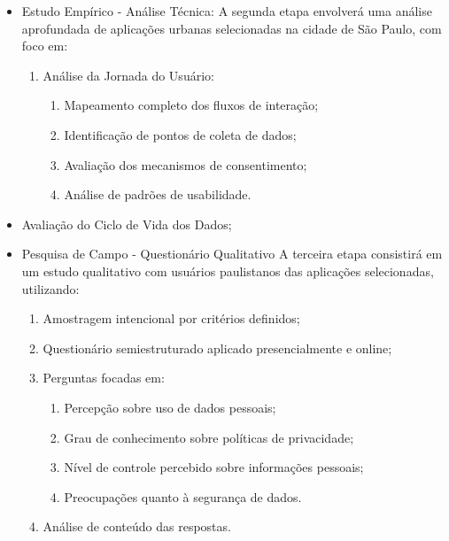 \documentclass[
	12pt,				%
	oneside,			%
	a4paper,			%
	english,			%
	brazil				%
	]{abntex2ppgsi}
\begin{document}
\begin{itemize}
             \item Estudo Empírico - Análise Técnica:
             A segunda etapa envolverá uma análise aprofundada de aplicações urbanas selecionadas na cidade de São Paulo, com foco em:
                 \begin{enumerate}
                   \item Análise da Jornada do Usuário:
                     \begin{enumerate}
                        \item Mapeamento completo dos fluxos de interação;
                        \item Identificação de pontos de coleta de dados;
                        \item Avaliação dos mecanismos de consentimento;
                        \item Análise de padrões de usabilidade.
                     \end{enumerate}
                 \end{enumerate}
                 \end{itemize}
                 \begin{itemize}
                   \item Avaliação do Ciclo de Vida dos Dados;   
             \item Pesquisa de Campo - Questionário Qualitativo 
             A terceira etapa consistirá em um estudo qualitativo com usuários paulistanos das aplicações selecionadas, utilizando:
                 \begin{enumerate}
                   \item Amostragem intencional por critérios definidos;
                   \item Questionário semiestruturado aplicado presencialmente e online;
                   \item Perguntas focadas em:
                     \begin{enumerate}
                        \item Percepção sobre uso de dados pessoais;
                        \item Grau de conhecimento sobre políticas de privacidade;
                        \item Nível de controle percebido sobre informações pessoais;
                        \item Preocupações quanto à segurança de dados.
                     \end{enumerate}
                   \item Análise de conteúdo das respostas.
                 \end{enumerate}             
    \end{itemize}
\end{document}

